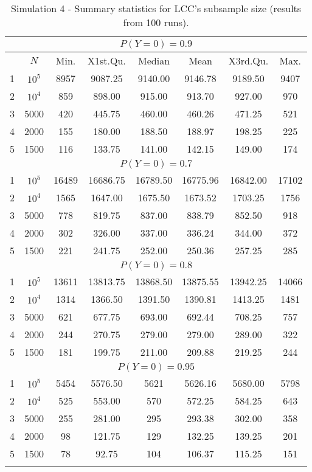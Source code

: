 \begin{longtable}{cccccccc}
  \hline
  \multicolumn{8}{c}{$P(Y=0) = 0.9$} \\
  \hline
 & $N$ & Min. & X1st.Qu. & Median & Mean & X3rd.Qu. & Max. \\ 
  \hline
1 & $10^5$ & 8957 & 9087.25 & 9140.00 & 9146.78 & 9189.50 & 9407 \\ 
  2 & $10^4$ & 859 & 898.00 & 915.00 & 913.70 & 927.00 & 970 \\ 
  3 & 5000 & 420 & 445.75 & 460.00 & 460.26 & 471.25 & 521 \\ 
  4 & 2000 & 155 & 180.00 & 188.50 & 188.97 & 198.25 & 225 \\ 
  5 & 1500 & 116 & 133.75 & 141.00 & 142.15 & 149.00 & 174 \\ 
   \hline
   \multicolumn{8}{c}{$P(Y=0) = 0.7$} \\
  \hline
1 & $10^5$ & 16489 & 16686.75 & 16789.50 & 16775.96 & 16842.00 & 17102 \\ 
  2 & $10^4$ & 1565 & 1647.00 & 1675.50 & 1673.52 & 1703.25 & 1756 \\ 
  3 & 5000 & 778 & 819.75 & 837.00 & 838.79 & 852.50 & 918 \\ 
  4 & 2000 & 302 & 326.00 & 337.00 & 336.24 & 344.00 & 372 \\ 
  5 & 1500 & 221 & 241.75 & 252.00 & 250.36 & 257.25 & 285 \\ 
  \hline
  \multicolumn{8}{c}{$P(Y=0) = 0.8$} \\
  \hline
1 & $10^5$ & 13611 & 13813.75 & 13868.50 & 13875.55 & 13942.25 & 14066 \\ 
  2 & $10^4$ & 1314 & 1366.50 & 1391.50 & 1390.81 & 1413.25 & 1481 \\ 
  3 & 5000 & 621 & 677.75 & 693.00 & 692.44 & 708.25 & 757 \\ 
  4 & 2000 & 244 & 270.75 & 279.00 & 279.00 & 289.00 & 322 \\ 
  5 & 1500 & 181 & 199.75 & 211.00 & 209.88 & 219.25 & 244 \\ 
   \hline
   \multicolumn{8}{c}{$P(Y=0) = 0.95$} \\
   \hline
1 & $10^5$ & 5454 & 5576.50 & 5621 & 5626.16 & 5680.00 & 5798 \\ 
  2 & $10^4$ & 525 & 553.00 & 570 & 572.25 & 584.25 & 643 \\ 
  3 & 5000 & 255 & 281.00 & 295 & 293.38 & 302.00 & 358 \\ 
  4 & 2000 &  98 & 121.75 & 129 & 132.25 & 139.25 & 201 \\ 
  5 & 1500 &  78 & 92.75 & 104 & 106.37 & 115.25 & 151 \\ 
   \hline
\caption[Simulation 4 - Summary statistics for LCC's subsample size.]{Simulation 4 - Summary statistics for LCC's subsample size (results from 100 runs).}
\label{tab:sim4-Ns}
\end{longtable}


